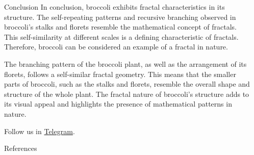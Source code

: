 \documentclass{beamer}
\begin{document}
\begin{frame}[t]
\begin{columns}[t]
\begin{column}{\onecolwid}
\begin{block}{Conclusion}
    In conclusion, broccoli exhibits fractal characteristics in its structure. The self-repeating patterns and recursive branching observed in broccoli's stalks and florets resemble the mathematical concept of fractals. This self-similarity at different scales is a defining characteristic of fractals. Therefore, broccoli can be considered an example of a fractal in nature.
    
    The branching pattern of the broccoli plant, as well as the arrangement of its florets, follows a self-similar fractal geometry. This means that the smaller parts of broccoli, such as the stalks and florets, resemble the overall shape and structure of the whole plant. The fractal nature of broccoli's structure adds to its visual appeal and highlights the presence of mathematical patterns in nature.
    
    Follow us in \href{https://t.me/vega_institute}{Telegram}.
    
    \end{block}
    
    
    \begin{block}{References}
    
    \printbibliography \vspace{0.75in}
    
    \end{block}
    
    \end{column} %
    
    \begin{column}{\lrmargin}\end{column} %
    
    \end{columns} %
    \end{frame} %
\end{document}
